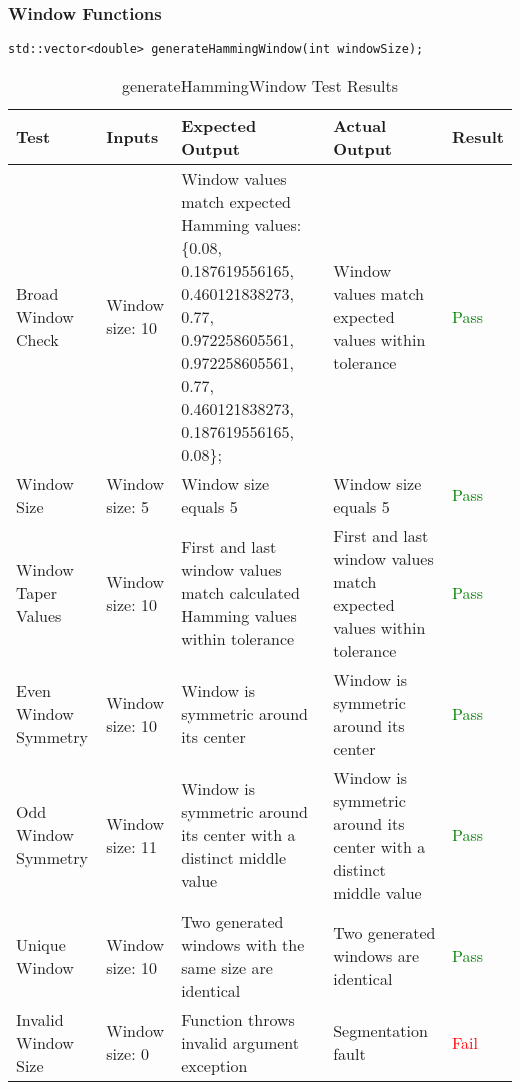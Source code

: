 \documentclass[12pt, titlepage]{article}
\begin{document}
\subsubsection{Window Functions}
\texttt{std::vector<double> generateHammingWindow(int windowSize);}\\
\begin{longtable}{|L{3cm}|L{3cm}|L{2.5cm}|L{2.5cm}|l|}
  \caption{generateHammingWindow Test Results} \\
  \hline
  \textbf{Test} & \textbf{Inputs} & \textbf{Expected Output} & \textbf{Actual Output} & \textbf{Result} \\
  \hline
  Broad Window Check &
    Window size: 10 &
    Window values match expected Hamming values: \{0.08, 0.187619556165, 
    0.460121838273, 0.77, 0.972258605561, 0.972258605561, 
    0.77, 0.460121838273, 0.187619556165, 0.08\};&
    Window values match expected values within tolerance &
    \textcolor{green}{Pass} \\
  \hline
  Window Size &
    Window size: 5 &
    Window size equals 5 &
    Window size equals 5 &
    \textcolor{green}{Pass} \\
  \hline
  Window Taper Values &
    Window size: 10 &
    First and last window values match calculated Hamming values within tolerance &
    First and last window values match expected values within tolerance &
    \textcolor{green}{Pass} \\
  \hline
  Even Window Symmetry &
    Window size: 10 &
    Window is symmetric around its center &
    Window is symmetric around its center &
    \textcolor{green}{Pass} \\
  \hline
  Odd Window Symmetry &
    Window size: 11 &
    Window is symmetric around its center with a distinct middle value &
    Window is symmetric around its center with a distinct middle value &
    \textcolor{green}{Pass} \\
  \hline
  Unique Window &
    Window size: 10 &
    Two generated windows with the same size are identical &
    Two generated windows are identical &
    \textcolor{green}{Pass} \\
  \hline
  Invalid Window Size &
    Window size: 0 &
    Function throws invalid argument exception &
    Segmentation fault &
    \textcolor{red}{Fail} \\
  \hline
\end{longtable}
\end{document}
